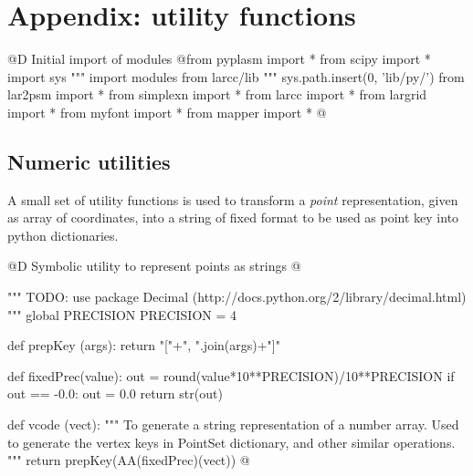 \documentclass[11pt,oneside]{article}	%
\begin{document}
\appendix
\section{Appendix: utility functions}
@D Initial import of modules
@{from pyplasm import *
from scipy import *
import sys
""" import modules from larcc/lib """
sys.path.insert(0, 'lib/py/')
from lar2psm import *
from simplexn import *
from larcc import *
from largrid import *
from myfont import *
from mapper import *
@}
\subsection{Numeric utilities}

A small set of utility functions is used to transform a \emph{point} representation, given as array of coordinates, into a string of fixed format to be used as point key into python dictionaries.

@D Symbolic utility to represent points as strings
@{""" TODO: use package Decimal (http://docs.python.org/2/library/decimal.html) """
global PRECISION
PRECISION = 4 

def prepKey (args): return "["+", ".join(args)+"]"

def fixedPrec(value):
	out = round(value*10**PRECISION)/10**PRECISION
	if out == -0.0: out = 0.0
	return str(out)
	
def vcode (vect): 
	"""
	To generate a string representation of a number array.
	Used to generate the vertex keys in PointSet dictionary, and other similar operations.
	"""
	return prepKey(AA(fixedPrec)(vect))
@}




\end{document}
